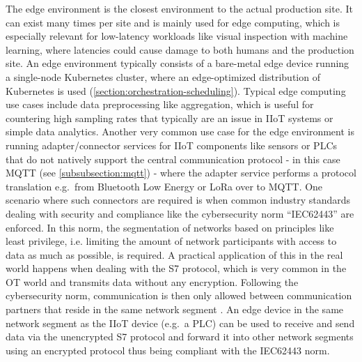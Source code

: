     \noindent The edge environment is the closest environment to the actual production site. It can exist many times per site and is mainly used for edge computing, which is especially relevant for low-latency workloads like visual inspection with machine learning, where latencies could cause damage to both humans and the production site. An edge environment typically consists of a bare-metal edge device running a single-node Kubernetes cluster, where an edge-optimized distribution of Kubernetes is used (\autoref{section:orchestration-scheduling}). Typical edge computing use cases include data preprocessing like aggregation, which is useful for countering high sampling rates that typically are an issue in IIoT systems or simple data analytics. Another very common use case for the edge environment is running adapter/connector services for IIoT components like sensors or PLCs that do not natively support the central communication protocol - in this case MQTT (see \autoref{subsubsection:mqtt}) - where the adapter service performs a protocol translation e.g.\ from Bluetooth Low Energy or LoRa over to MQTT. One scenario where such connectors are required is when common industry standards dealing with security and compliance like the cybersecurity norm ``IEC62443'' are enforced. In this norm, the segmentation of networks based on principles like least privilege, i.e. limiting the amount of network participants with access to data as much as possible, is required. A practical application of this in the real world happens when dealing with the S7 protocol, which is very common in the OT world and transmits data without any encryption. Following the cybersecurity norm, communication is then only allowed between communication partners that reside in the same network segment \cite{geiger_zones_2018}. An edge device in the same network segment as the IIoT device (e.g.\ a PLC) can be used to receive and send data via the unencrypted S7 protocol and forward it into other network segments using an encrypted protocol thus being compliant with the IEC62443 norm.  

